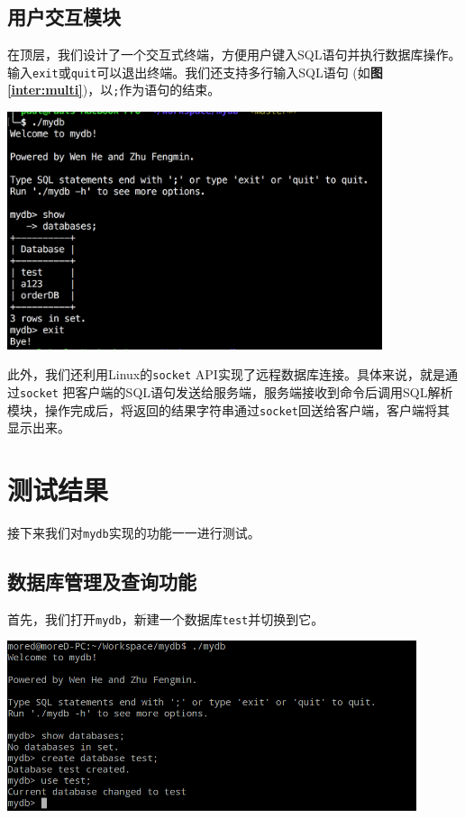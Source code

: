 \documentclass[11pt, a4paper]{article}
\makeatletter
\newcommand\fcaption{\def\@captype{figure}\caption}
\newcommand{\fref}[1]{\textbf{图\ref{#1}}}
\makeatother
\begin{document}
\subsection{用户交互模块}

在顶层，我们设计了一个交互式终端，方便用户键入SQL语句并执行数据库操作。输入\texttt{exit}或\texttt{quit}可以退出终端。我们还支持多行输入SQL语句  (如\fref{inter:multi})，以\texttt{;}作为语句的结束。

\begin{center}
    \includegraphics[width=11cm]{fig/multi-row}
    \fcaption{交互式终端允许多行输入}\label{inter:multi}
\end{center}

此外，我们还利用Linux的\texttt{socket} API实现了远程数据库连接。具体来说，就是通过\texttt{socket} 把客户端的SQL语句发送给服务端，服务端接收到命令后调用SQL解析模块，操作完成后，将返回的结果字符串通过\texttt{socket}回送给客户端，客户端将其显示出来。

\section{测试结果}

接下来我们对\texttt{mydb}实现的功能一一进行测试。

\subsection{数据库管理及查询功能}

首先，我们打开\texttt{mydb}，新建一个数据库\texttt{test}并切换到它。

\begin{center}
    \includegraphics[width=12cm]{fig/create-db}
    \fcaption{新建数据库并切换}
\end{center}
\end{document}
